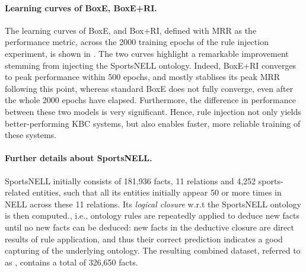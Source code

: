 \documentclass{article}
\begin{document}
\paragraph{Learning curves of BoxE, BoxE+RI.} The learning curves of BoxE, and Box+RI, defined with MRR as the performance metric, across the 2000 training epochs of the rule injection experiment, is shown in . The two curves highlight a remarkable improvement stemming from injecting the SportsNELL ontology. Indeed, BoxE+RI converges to peak performance within 500 epochs, and mostly stablises its peak MRR following this point, whereas standard BoxE does not fully converge, even after the whole 2000 epochs have elapsed. Furthermore, the difference in performance between these two models is very significant. Hence, rule injection not only yields better-performing KBC systems, but also enables faster, more reliable training of these systems.  

\paragraph{Further details about SportsNELL.}
\label{app:SportsNELL}
SportsNELL initially consists of 181,936 facts, 11 relations and 4,252 sports-related entities, such that all its entities initially appear 50 or more times in NELL across these 11 relations. Its \emph{logical closure} w.r.t the SportsNELL ontology is then computed., i.e., ontology rules are repeatedly applied to deduce new facts until no new facts can be deduced: new facts in the deductive closure are direct results of rule application, and thus their correct prediction indicates a good capturing of the underlying ontology. The resulting combined dataset, referred to as , contains a total of 326,650 facts.
\clearpage{}
\end{document}
